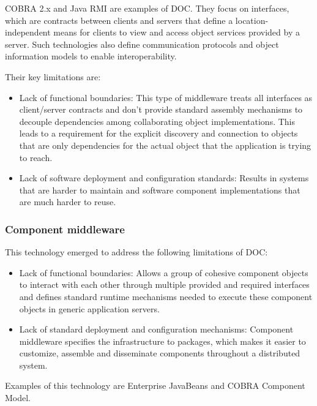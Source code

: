     COBRA 2.x and Java RMI are examples of DOC. They focus on interfaces, which are contracts between clients and
    servers that define a location-independent means for clients to view and access object services provided by a
    server. Such technologies also define communication protocols and object information models to enable
    interoperability.

    Their key limitations are:
    \begin{itemize}
        \item Lack of functional boundaries: This type of middleware treats all interfaces as client/server
        contracts and don't provide standard assembly mechanisms to decouple dependencies among collaborating
        object implementations. This leads to a requirement for the explicit discovery and connection to objects
        that are only dependencies for the actual object that the application is trying to reach.
        \item Lack of software deployment and configuration standards: Results in systems that are harder to
        maintain and software component implementations that are much harder to reuse.
    \end{itemize}

    \subsubsection{Component middleware}
    This technology emerged to address the following limitations of DOC:
    \begin{itemize}
        \item Lack of functional boundaries: Allows a group of cohesive component objects to
        interact with each other through multiple provided and required interfaces and defines standard
        runtime mechanisms needed to execute these component objects in generic application servers.
        \item Lack of standard deployment and configuration mechanisms: Component middleware specifies the
        infrastructure to packages, which makes it easier to customize, assemble and disseminate components
        throughout a distributed system.
    \end{itemize}

    Examples of this technology are Enterprise JavaBeans and COBRA Component Model.

